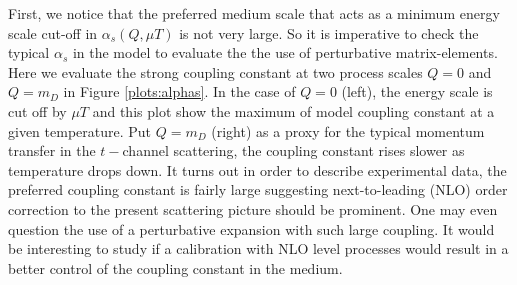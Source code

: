 \documentclass[aps, prc, reprint, amsmath, groupedaddress, nofootinbib]{revtex4-1}
\begin{document}
First, we notice that the preferred medium scale that acts as a minimum energy scale cut-off in $\alpha_s(Q, \mu T)$ is not very large.
So it is imperative to check the typical $\alpha_s$ in the model to evaluate the the use of perturbative matrix-elements.
Here we evaluate the strong coupling constant at two process scales $Q=0$ and $Q=m_D$ in Figure \ref{plots:alphas}.
In the case of $Q=0$ (left), the energy scale is cut off by $\mu T$ and this plot show the maximum of model coupling constant at a given temperature.
Put $Q=m_D$ (right) as a proxy for the typical momentum transfer in the $t-$channel scattering, the coupling constant rises slower as temperature drops down.
It turns out in order to describe experimental data, the preferred coupling constant is fairly large suggesting next-to-leading (NLO) order correction to the present scattering picture should be prominent.
One may even question the use of a perturbative expansion with such large coupling.
It would be interesting to study if a calibration with NLO level processes would result in a better control of the coupling constant in the medium.
\end{document}
